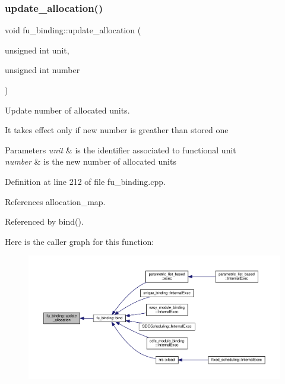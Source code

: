 \subsubsection{\texorpdfstring{update\+\_\+allocation()}{update\_allocation()}}
{\footnotesize\ttfamily void fu\+\_\+binding\+::update\+\_\+allocation (\begin{DoxyParamCaption}\item[{unsigned int}]{unit,  }\item[{unsigned int}]{number }\end{DoxyParamCaption})\hspace{0.3cm}{\ttfamily [protected]}}



Update number of allocated units. 

It takes effect only if new number is greather than stored one 
\begin{DoxyParams}{Parameters}
{\em unit} & is the identifier associated to functional unit \\
\hline
{\em number} & is the new number of allocated units \\
\hline
\end{DoxyParams}


Definition at line 212 of file fu\+\_\+binding.\+cpp.



References allocation\+\_\+map.



Referenced by bind().

Here is the caller graph for this function\+:
\nopagebreak
\begin{figure}[H]
\begin{center}
\leavevmode
\includegraphics[width=350pt]{d8/d04/classfu__binding_ae411f4781db5b250a15b49f562290b3e_icgraph}
\end{center}
\end{figure}
\mbox{\label{classfu__binding_adf23b4232428cdc1ecb9247926b58a2e}} 
